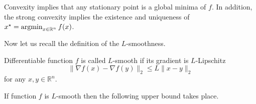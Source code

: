 Convexity implies that any stationary point is a global minima of $f$. In addition, the strong convexity implies the existence and uniqueness of $x^\star = \operatorname*{argmin}_{x\in\mathbb{R}^n} f(x)$.

Now let us recall the definition of the $L$-smoothness. 

\begin{definition}[$L$-smoothness]
Differentiable function $f$ is called $L$-smooth if its gradient is $L$-Lipschitz
\begin{equation}
    \|\nabla f(x) - \nabla f(y)\|_2\leq L\|x-y\|_2
\end{equation}
for any $x,y\in\mathbb{R}^n$.
\end{definition}

If function $f$ is $L$-smooth then the following upper bound takes place.

